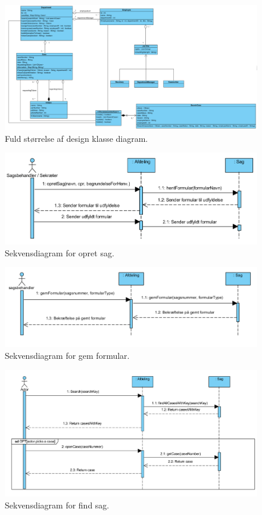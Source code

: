 \begin{figure}[hbt!]
  \includegraphics[width=\linewidth]{./PNG/design/fulddesignklassediagram.PNG} 
  \caption{Fuld størrelse af design klasse diagram.}
  \label{fig:fuldDesignKlasseDiagram}
\end{figure}

\begin{figure}[hbt!]
  \includegraphics[width=\linewidth]{./PNG/sekDiaOpretSag.PNG} 
  \caption{Sekvensdiagram for opret sag.}
  \label{fig:OpretSag}
\end{figure}

\begin{figure}[hbt!]
  \includegraphics[width=\linewidth]{./PNG/sekDiaGemFormular.PNG} 
  \caption{Sekvensdiagram for gem formular.}
  \label{fig:GemForm}
\end{figure}
\newpage
\begin{figure}[hbt!]
  \includegraphics[width=\linewidth]{./PNG/sekDiaFindSag.PNG} 
  \caption{Sekvensdiagram for find sag.}
  \label{fig:FindSag}
\end{figure}

